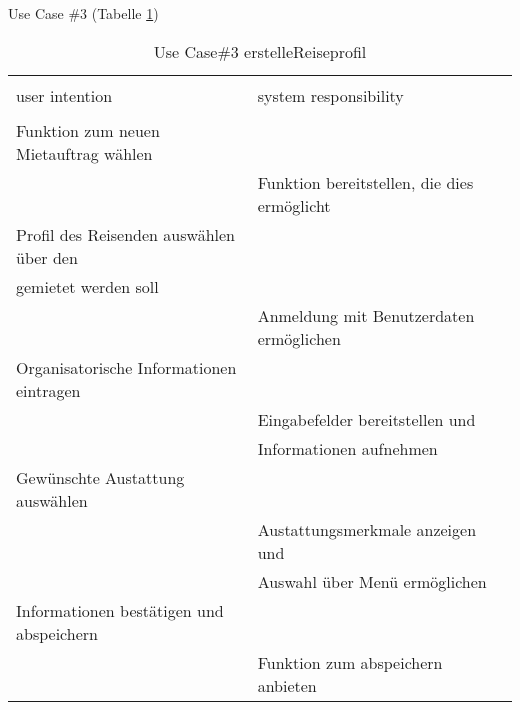 Use Case \#3 (Tabelle \ref{tab:mietauftragUC})
\begin{table}[H]
\caption{Use Case\#3 erstelleReiseprofil }
\centering
\begin{tabular}{l l}
\\ [-0.5ex]

\hline\hline
\\ [-0.5ex]
user intention & system responsibility
\\ [1.5ex]
\hline
\\ [-0.5ex]
Funktion zum neuen Mietauftrag wählen     &                                   \\[1ex]
                                 & Funktion bereitstellen, die dies ermöglicht   \\[1ex]
Profil des Reisenden auswählen über den      &                                   \\[1ex]
gemietet werden soll                      &                                   \\[1ex]
                                 & Anmeldung mit Benutzerdaten ermöglichen    \\[1ex]
Organisatorische Informationen eintragen  &                                   \\[1ex] 
                                 & Eingabefelder bereitstellen und            \\[1ex]
                                 & Informationen aufnehmen                 \\[1ex]
Gewünschte Austattung auswählen           &                                   \\[1ex]
                                 & Austattungsmerkmale anzeigen und           \\[1ex]
                                 & Auswahl über Menü ermöglichen           \\[1ex]
Informationen bestätigen und abspeichern  &                                   \\[1ex]
                                 & Funktion zum abspeichern anbieten          \\[1ex]

\hline
\end{tabular}
\label{tab:mietauftragUC}
\end{table}

